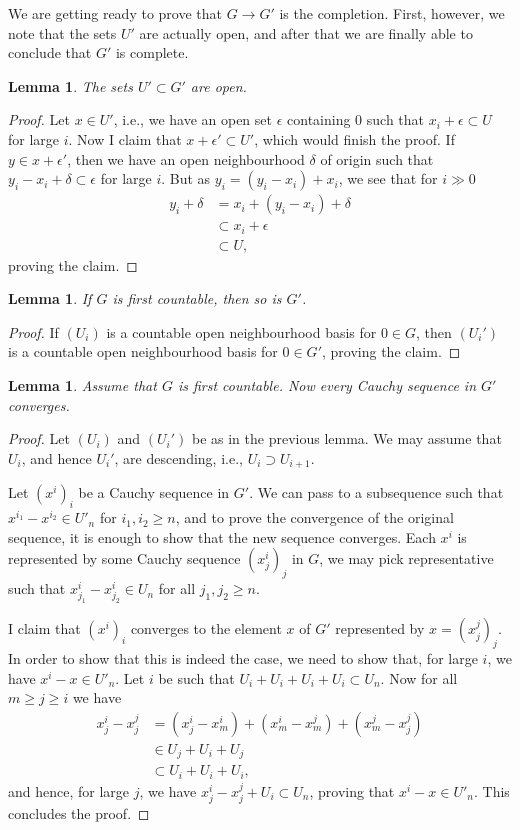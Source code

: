 \documentclass[12pt,a4paper,leqno]{article}
\theoremstyle{plain}
\newtheorem{lem}[theo]{Lemma}
\theoremstyle{definition}
\theoremstyle{remark}
\begin{document}
We are getting ready to prove that $G \to G'$ is the completion. First, however, we note that the sets $U'$ are actually open, and after that we are finally able to conclude that $G'$ is complete.

\begin{lem}
The sets $U' \subset G'$ are open.
\end{lem}
\begin{proof}
Let $x \in U'$, i.e., we have an open set $\epsilon$ containing $0$ such that $x_i + \epsilon \subset U$ for large $i$. Now I claim that $x + \epsilon' \subset U'$, which would finish the proof. If $y \in x + \epsilon'$, then we have an open neighbourhood $\delta$ of origin such that $y_i - x_i + \delta \subset \epsilon$ for large $i$. But as $y_i = (y_i - x_i) + x_i$, we see that for $i \gg 0$
\begin{align*}
y_i + \delta &= x_i + (y_i - x_i) + \delta \\
&\subset x_i + \epsilon \\
&\subset U,
\end{align*}
proving the claim.
\end{proof}

\begin{lem}
If $G$ is first countable, then so is $G'$.
\end{lem}
\begin{proof}
If $(U_i)$ is a countable open neighbourhood basis for $0 \in G$, then $(U_i')$ is a countable open neighbourhood basis for $0 \in G'$, proving the claim.
\end{proof}

\begin{lem}
Assume that $G$ is first countable. Now every Cauchy sequence in $G'$ converges.
\end{lem}
\begin{proof}
Let $(U_i)$ and $(U_i')$ be as in the previous lemma. We may assume that $U_i$, and hence $U_i'$, are descending, i.e., $U_i \supset U_{i+1}$.

Let $(x^i)_i$ be a Cauchy sequence in $G'$. We can pass to a subsequence such that $x^{i_1} - x^{i_2} \in U'_n$ for $i_1, i_2 \geq n$, and to prove the convergence of the original sequence, it is enough to show that the new sequence converges. Each $x^i$ is represented by some Cauchy sequence $(x^i_j)_j$ in $G$, we may pick representative such that $x^i_{j_1} - x^i_{j_2} \in U_n$ for all $j_1, j_2 \geq n$. 

I claim that $(x^i)_i$ converges to the element $x$ of $G'$ represented by $x=(x^j_j)_j$. In order to show that this is indeed the case, we need to show that, for large $i$, we have $x^i - x \in U'_n$. Let $i$ be such that $U_i + U_i + U_i + U_i \subset U_n$. Now for all $m \geq j \geq i$ we have
\begin{align*}
x^i_j - x^j_j &= (x^i_j - x^i_m) + (x^i_m - x^j_m) + (x^j_m - x^j_j) \\
&\in U_j + U_i + U_j \\
&\subset U_i + U_i + U_i,
\end{align*}
and hence, for large $j$, we have $x^i_j - x^j_j + U_i \subset U_n$, proving that $x^i - x \in U'_n$. This concludes the proof.
\end{proof}
\end{document}
